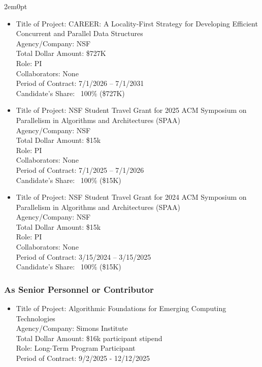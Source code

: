\begin{adjustwidth}{2em}{0pt}
\begin{itemize}
\item
    Title of Project: CAREER: A Locality-First Strategy for Developing
Efficient Concurrent and Parallel Data Structures \\
    Agency/Company: NSF \\
    Total Dollar Amount: \$727K \\
    Role: PI \\
    Collaborators: None  \\
    Period of Contract: 7/1/2026 – 7/1/2031 \\
    Candidate’s Share: ~100\% (\$727K)
    \item
    Title of Project: NSF Student Travel Grant for 2025 ACM Symposium on Parallelism in Algorithms and Architectures (SPAA)\\
    Agency/Company: NSF \\
    Total Dollar Amount: \$15k \\
    Role: PI \\
    Collaborators: None \\
    Period of Contract: 7/1/2025 – 7/1/2026 \\
    Candidate’s Share: ~100\% (\$15K)
    \item
    Title of Project: NSF Student Travel Grant for 2024 ACM Symposium on Parallelism in Algorithms and Architectures (SPAA)\\
    Agency/Company: NSF \\
    Total Dollar Amount: \$15k \\
    Role: PI \\
    Collaborators: None \\
    Period of Contract: 3/15/2024 – 3/15/2025 \\
    Candidate’s Share: ~100\% (\$15K)
\end{itemize}

\subsubsection{As Senior Personnel or Contributor}

\begin{itemize}
    \item
    Title of Project: Algorithmic Foundations for Emerging Computing Technologies\\
    Agency/Company: Simons Institute \\
    Total Dollar Amount: \$16k participant stipend\\
    Role: Long-Term Program Participant \\
    Period of Contract: 9/2/2025 - 12/12/2025 \\
\end{itemize}


\end{adjustwidth}
